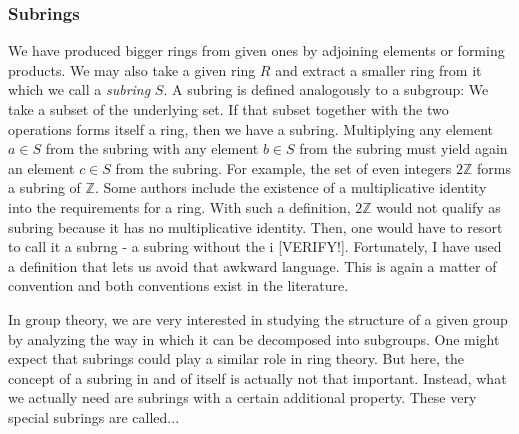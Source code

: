 \subsubsection{Subrings}
We have produced bigger rings from given ones by adjoining elements or forming products. We may also take a given ring $R$ and extract a smaller ring from it which we call a \emph{subring} $S$. A subring is defined analogously to a subgroup: We take a subset of the underlying set. If that subset together with the two operations forms itself a ring, then we have a subring. Multiplying any element $a \in S$ from the subring with any element $b \in S$ from the subring must yield again an element $c \in S$ from the subring. For example, the set of even integers $2 \mathbb{Z}$ forms a subring of $\mathbb{Z}$. Some authors include the existence of a multiplicative identity into the requirements for a ring. With such a definition, $2 \mathbb{Z}$ would not qualify as subring because it has no multiplicative identity. Then, one would have to resort to call it a subrng - a subring without the i [VERIFY!]. Fortunately, I have used a definition that lets us avoid that awkward language. This is again a matter of convention and both conventions exist in the literature.

\medskip
In group theory, we are very interested in studying the structure of a given group by analyzing the way in which it can be decomposed into subgroups. One might expect that subrings could play a similar role in ring theory. But here, the concept of a subring in and of itself is actually not that important. Instead, what we actually need are subrings with a certain additional property. These very special subrings are called...




